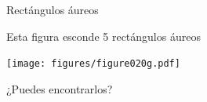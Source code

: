 \documentclass[14pt,aspectratio=169,usenames,dvipsnames]{beamer}
\begin{document}

    \begin{frame}{Rectángulos áureos}
        \begin{center}
            Esta figura esconde 5 rectángulos áureos

            \bigskip\bigskip

            \texttt{[image: figures/figure020g.pdf]} \\

            \bigskip

            ¿Puedes encontrarlos?
        \end{center}
    \end{frame}

\end{document}

